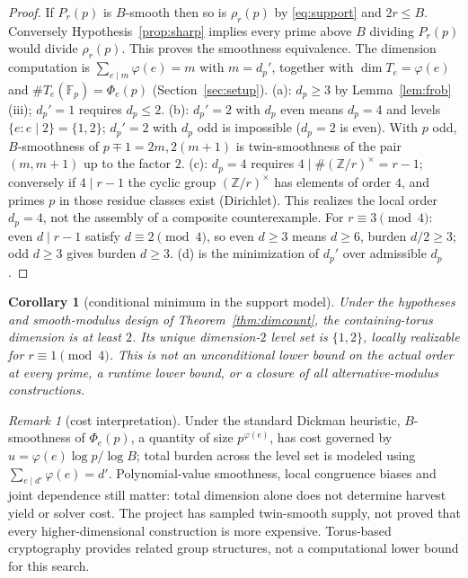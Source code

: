 \documentclass[11pt]{article}
\newtheorem{corollary}[theorem]{Corollary}
\theoremstyle{remark}
\newtheorem{remark}[theorem]{Remark}
\newcommand{\Z}{\mathbb{Z}}
\newcommand{\F}{\mathbb{F}}
\begin{document}
\begin{proof}
If $P_r(p)$ is $B$-smooth then so is $\rho_r(p)$ by \eqref{eq:support}
and $2r\le B$. Conversely Hypothesis~\ref{prop:sharp} implies every prime
above $B$ dividing $P_r(p)$ would divide $\rho_r(p)$. This proves the
smoothness equivalence. The dimension computation is
$\sum_{e \mid m}\varphi(e) = m$ with $m = d_p'$, together with
$\dim T_e = \varphi(e)$ and $\#T_e(\F_p) = \Phi_e(p)$
(Section~\ref{sec:setup}). (a): $d_p \ge 3$ by
Lemma~\ref{lem:frob}(iii); $d_p' = 1$ requires $d_p \le 2$. (b):
$d_p' = 2$ with $d_p$ even means $d_p = 4$ and levels $\{e : e \mid 2\} =
\{1,2\}$; $d_p' = 2$ with $d_p$ odd is impossible ($d_p = 2$ is even). With
$p$ odd, $B$-smoothness of $p \mp 1 = 2m, 2(m+1)$ is twin-smoothness of the
pair $(m, m+1)$ up to the factor $2$. (c): $d_p = 4$ requires
$4 \mid \#(\Z/r)^\times = r-1$; conversely if $4 \mid r-1$ the cyclic group
$(\Z/r)^\times$ has elements of order $4$, and primes $p$ in those residue
classes exist (Dirichlet). This realizes the local order $d_p=4$, not the
assembly of a composite counterexample.
For $r \equiv 3 \pmod 4$: even $d \mid r-1$ satisfy
$d \equiv 2 \pmod 4$, so even $d \ge 3$ means $d \ge 6$, burden
$d/2 \ge 3$; odd $d \ge 3$ gives burden $d \ge 3$. (d) is the minimization
of $d_p'$ over admissible $d_p$.
\end{proof}

\begin{corollary}[conditional minimum in the support model]\label{cor:optc}
Under the hypotheses and smooth-modulus design of
Theorem~\ref{thm:dimcount}, the containing-torus dimension is at least $2$.
Its unique dimension-$2$ level set is $\{1,2\}$, locally realizable for
$r\equiv1\pmod4$. This is not an unconditional lower bound on the actual
order at every prime, a runtime lower bound, or a closure of all
alternative-modulus constructions.
\end{corollary}

\begin{remark}[cost interpretation]\label{rem:cost}
Under the standard Dickman heuristic, $B$-smoothness of $\Phi_e(p)$, a
quantity of size $p^{\varphi(e)}$, has cost governed by
$u = \varphi(e)\log p / \log B$; total burden across the level set is
modeled using $\sum_{e\mid d'}\varphi(e)=d'$. Polynomial-value smoothness,
local congruence biases and joint dependence still matter: total dimension
alone does not determine harvest yield or solver cost. The project has
sampled twin-smooth supply, not proved that every higher-dimensional
construction is more expensive. Torus-based cryptography \cite{RS} provides
related group structures, not a computational lower bound for this search.
\end{remark}
\end{document}
